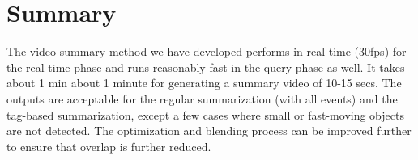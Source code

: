\section{Summary}

The video summary method we have developed performs in real-time (30fps) for the real-time phase and runs reasonably fast in the query phase as well. It takes about 1 min about 1 minute for generating a summary video of 10-15 secs. The outputs are acceptable for the regular summarization (with all events) and the tag-based summarization, except a few cases where small or fast-moving objects are not detected. The optimization and blending process can be improved further to ensure that overlap is further reduced.
